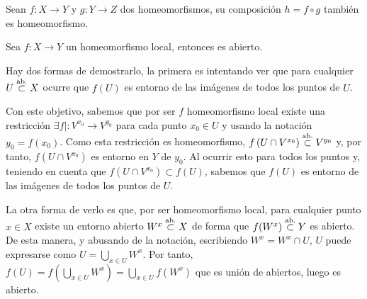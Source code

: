 \begin{prop}
Sean $f: X \rightarrow Y$ y $g: Y \rightarrow Z$ dos homeomorfismos, su composición $h = f \circ g$ también es homeomorfismo.
\end{prop}

\begin{prop}
Sea $f:X\rightarrow Y$ un homeomorfismo local, entonces es abierto.
\end{prop}
\begin{demo}
Hay dos formas de demostrarlo, la primera es intentando ver que para cualquier $U \stackrel{\text{ab.}}{\subset} X$ ocurre que $f\left( U \right)$ es entorno de las imágenes de todos los puntos de $U$.

Con este objetivo, sabemos que por ser $f$ homeomorfismo local existe una restricción $\exists f| : V^{x_0} \rightarrow V^{y_0}$ para cada punto $x_0\in U$ y usando la notación $y_0 = f(x_0)$. Como esta restricción es homeomorfismo, $f\left( U \cap V^{x_0} \right) \stackrel{\text{ab.}}{\subset} V^{y_0}$ y, por tanto, $ f \left( U \cap V^{x_0} \right)$ es entorno en $Y$ de $y_0$. Al ocurrir esto para todos los puntos y, teniendo en cuenta que $f \left( U \cap V^{x_0} \right)\subset f(U)$, sabemos que $f(U)$ es entorno de las imágenes de todos los puntos de $U$.

La otra forma de verlo es que, por ser homeomorfismo local, para cualquier punto $x\in X$ existe un entorno abierto $W^x \stackrel{\text{ab.}}{\subset} X$ de forma que $f(W^x)\stackrel{\text{ab.}}{\subset} Y$ es abierto. De esta manera, y abusando de la notación, escribiendo $W^x = W^x \cap U$, $U$ puede expresarse como $U = \bigcup_{x\in U} W^x$. Por tanto, $f(U) = f(\bigcup_{x\in U} W^x) = \bigcup_{x\in U} f(W^x)$ que es unión de abiertos, luego es abierto.
\end{demo}

